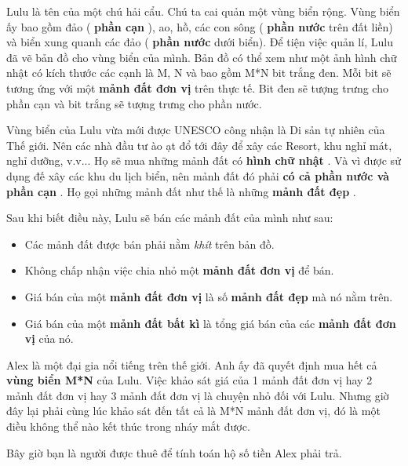 Lulu là tên của một chú hải cẩu. Chú ta cai quản một vùng biển rộng. Vùng biển ấy bao gồm đảo (   \textbf{    phần cạn   }   ), ao, hồ, các con sông (   \textbf{    phần nước   }   trên đất liền) và biển xung quanh các đảo (   \textbf{    phần nước   }   dưới biển). Để tiện việc quản lí, Lulu đã vẽ bản đồ cho vùng biển của mình. Bản đồ có thể xem như một ảnh hình chữ nhật có kích thước các cạnh là M, N và bao gồm M*N bit trắng đen. Mỗi bit sẽ tương ứng với một   \textbf{    mảnh đất đơn vị   }   trên thực tế. Bit đen sẽ tượng trưng cho phần cạn và bit trắng sẽ tượng trưng cho phần nước.  

   Vùng biển của Lulu vừa mới được UNESCO công nhận là Di sản tự nhiên của Thế giới. Nên các nhà đầu tư ào ạt đổ tới đây để xây các Resort, khu nghỉ mát, nghỉ dưỡng, v.v... Họ sẽ mua những mảnh đất có   \textbf{    hình chữ nhật   }   . Và vì được sử dụng đế xây các khu du lịch biển, nên mảnh đất đó phải   \textbf{    có cả phần nước và phần cạn   }   . Họ gọi những mảnh đất như thế là   \textbf{}   những   \textbf{    mảnh đất đẹp   }   .  

   Sau khi biết điều này, Lulu sẽ bán các mảnh đất của mình như sau:  
\begin{itemize}
	\item     Các mảnh đất được bán phải nằm    \emph{     khít    }    trên bản đồ.   
	\item     Không chấp nhận việc chia nhỏ một    \textbf{     mảnh đất đơn vị    }    để bán.   
	\item     Giá bán của một    \textbf{     mảnh đất đơn vị    }    là số    \textbf{     mảnh đất đẹp    }    mà nó nằm trên.   
	\item     Giá bán của một    \textbf{     mảnh đất bất kì    }    là tổng giá bán của các    \textbf{     mảnh đất đơn vị    }    của nó.   
\end{itemize}

   Alex là một đại gia nổi tiếng trên thế giới. Anh ấy đã quyết định mua hết cả   \textbf{    vùng biển M*N   }   của Lulu. Việc khảo sát giá của 1 mảnh đất đơn vị hay 2 mảnh đất đơn vị hay 3 mảnh đất đơn vị là chuyện nhỏ đối với Lulu. Nhưng giờ đây lại phải cùng lúc khảo sát đến tất cả là M*N mảnh đất đơn vị, đó là một điều không thể nào kết thúc trong nháy mắt được.  

   Bây giờ bạn là người được thuê để tính toán hộ số tiền Alex phải trả.  
\begin{itemize}
\end{itemize}